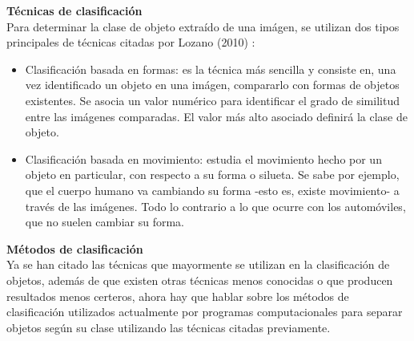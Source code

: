 \documentclass[a4paper,12pt,oneside,spanish]{book}
\begin{document}
\begin{enumerate}[label=\alph*)]
		\textbf{Técnicas de clasificación}\\
		Para determinar la clase de objeto extraído de una imágen, se utilizan dos tipos principales de técnicas citadas por Lozano (2010) \cite{lozano}:
		\begin{itemize}
			\setlength\itemsep{-1.2em}
			\item Clasificación basada en formas: es la técnica más sencilla y consiste en, una vez identificado un objeto en una imágen, compararlo con formas de objetos existentes. Se asocia un valor numérico para identificar el grado de similitud entre las imágenes comparadas. El valor más alto asociado definirá la clase de objeto.\\
			\item Clasificación basada en movimiento: estudia el movimiento hecho por un objeto en particular, con respecto a su forma o silueta. Se sabe por ejemplo, que el cuerpo humano va cambiando su forma -esto es, existe movimiento- a través de las imágenes. Todo lo contrario a lo que ocurre con los automóviles, que no suelen cambiar su forma.
		\end{itemize}
		
		\textbf{Métodos de clasificación}\\
		Ya se han citado las técnicas que mayormente se utilizan en la clasificación de objetos, además de que existen otras técnicas menos conocidas o que producen resultados menos certeros, ahora hay que hablar sobre los métodos de clasificación utilizados actualmente por programas computacionales para separar objetos según su clase utilizando las técnicas citadas previamente.\par
		

\end{enumerate}
\end{document}
